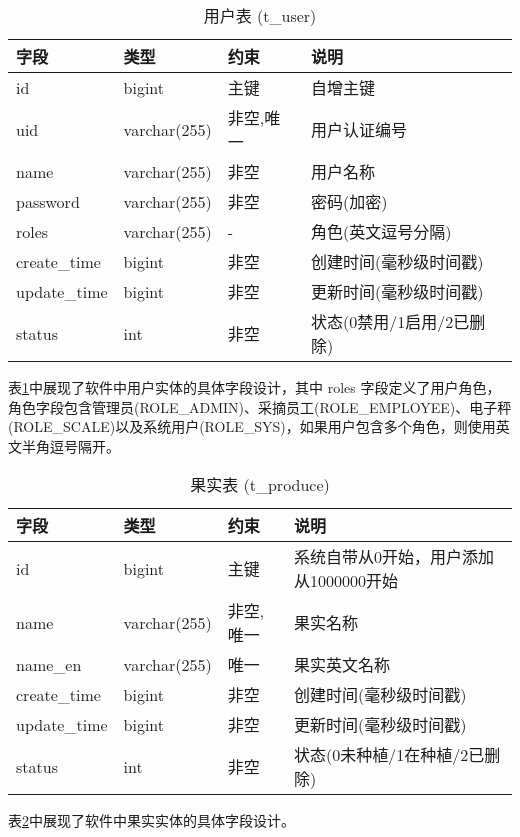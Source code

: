 \begin{table}[H]
    \centering
    \caption{用户表 (t\_user)}
    \label{tab:user}
    \begin{tabular}{|l|l|l|l|}
    \hline
    字段 & 类型 & 约束 & 说明 \\
    \hline
    id & bigint & 主键 & 自增主键 \\
    uid & varchar(255) & 非空,唯一 & 用户认证编号 \\
    name & varchar(255) & 非空 & 用户名称 \\
    password & varchar(255) & 非空 & 密码(加密) \\
    roles & varchar(255) & - & 角色(英文逗号分隔) \\
    create\_time & bigint & 非空 & 创建时间(毫秒级时间戳) \\
    update\_time & bigint & 非空 & 更新时间(毫秒级时间戳) \\
    status & int & 非空 & 状态(0禁用/1启用/2已删除) \\
    \hline
    \end{tabular}
    \end{table}

表\ref{tab:user}中展现了软件中用户实体的具体字段设计，其中 roles 字段定义了用户角色，角色字段包含管理员(ROLE\_ADMIN)、采摘员工(ROLE\_EMPLOYEE)、电子秤(ROLE\_SCALE)以及系统用户(ROLE\_SYS)，如果用户包含多个角色，则使用英文半角逗号隔开。

\begin{table}[H]
\centering
\caption{果实表 (t\_produce)}
\label{tab:produce}
\begin{tabular}{|l|l|l|l|}
\hline
字段 & 类型 & 约束 & 说明 \\
\hline
id & bigint & 主键 & 系统自带从0开始，用户添加从1000000开始 \\
name & varchar(255) & 非空,唯一 & 果实名称 \\
name\_en & varchar(255) & 唯一 & 果实英文名称 \\
create\_time & bigint & 非空 & 创建时间(毫秒级时间戳) \\
update\_time & bigint & 非空 & 更新时间(毫秒级时间戳) \\
status & int & 非空 & 状态(0未种植/1在种植/2已删除) \\
\hline
\end{tabular}
\end{table}

表\ref{tab:produce}中展现了软件中果实实体的具体字段设计。

